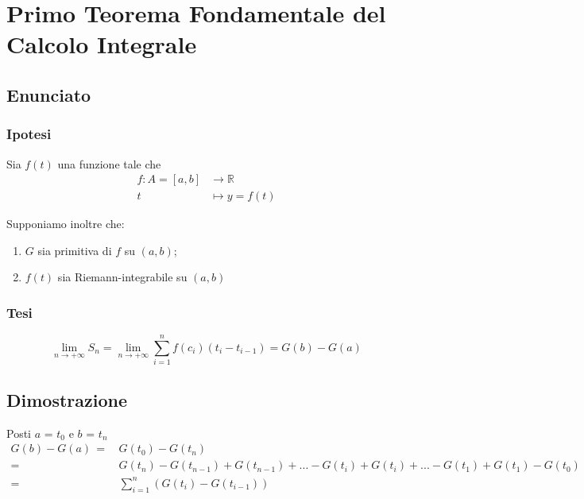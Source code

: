 \documentclass[../dimostrazioni]{subfiles}
\begin{document}
    \chapter{Primo Teorema Fondamentale del Calcolo Integrale}
    \label{teoFondCalcoloIntegrale1}

        \section*{Enunciato}

            \subsection*{Ipotesi}

                Sia \(f(t)\) una funzione tale che
                \begin{align*}
                    f : A = [a, b] &\longrightarrow \mathbb{R}\\
                    t &\longmapsto y = f(t) 
                \end{align*}

                Supponiamo inoltre che:

                \begin{enumerate}
                    \indentitem \item \(G\) sia primitiva di \(f\) su \((a, b)\);
                    \indentitem \item \(f(t)\) sia Riemann-integrabile su \((a, b)\)
                \end{enumerate}

            \subsection*{Tesi}

                \[\lim_{n\to +\infty} {S_n} = \lim_{n\to +\infty} {\sum_{i=1}^{n} f(c_i)({t_i} - t_{i-1})} = G(b) - G(a) \]

        \section*{Dimostrazione}

                Posti \(a\) = \(t_0\) e \(b\) = \(t_n\)
                \begin{align*}
                    G(b) - G(a) \, =& \, G(t_0) - G(t_n) \\
                    =& \, G(t_n) - G(t_{n-1}) + G(t_{n-1}) + ... - G(t_i) + G(t_i) + ... - G(t_1) + G(t_1) - G(t_0) \\
                    =& \, \sum_{i=1}^n (G(t_i) - G(t_{i-1}))
                \end{align*}
\end{document}
